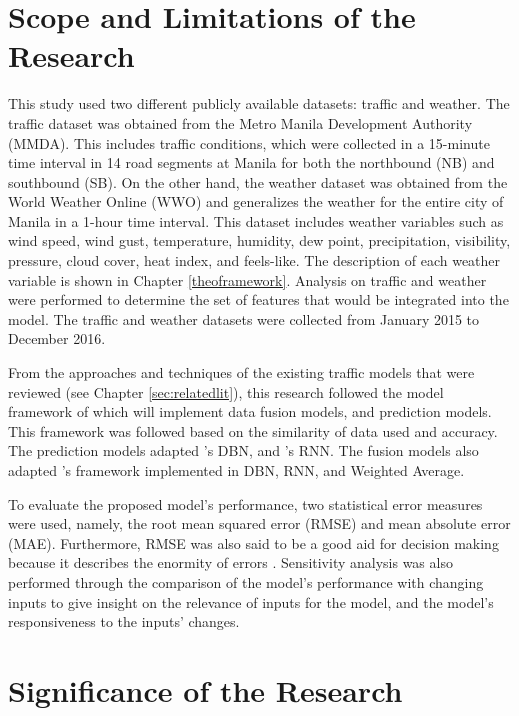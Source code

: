 \section{Scope and Limitations of the Research}
\label{sec:scopelimitations}

This study used two different publicly available datasets: traffic and weather. The traffic dataset was obtained from the Metro Manila Development Authority (MMDA). This includes traffic conditions, which were collected in a 15-minute time interval in 14 road segments at Manila for both the northbound (NB) and southbound (SB). On the other hand, the weather dataset was obtained from the World Weather Online (WWO) and generalizes the weather for the entire city of Manila in a 1-hour time interval. This dataset includes weather variables such as wind speed, wind gust, temperature, humidity, dew point, precipitation, visibility, pressure, cloud cover, heat index, and feels-like. The description of each weather variable is shown in Chapter \ref{theoframework}. Analysis on traffic and weather were performed to determine the set of features that would be integrated into the model. The traffic and weather datasets were collected from January 2015 to December 2016.

From the approaches and techniques of the existing traffic models that were reviewed (see Chapter \ref{sec:relatedlit}), this research followed the model framework of  which will implement data fusion models, and prediction models. This framework was followed based on the similarity of data used and accuracy. The prediction models adapted 's DBN, and 's RNN. The fusion models also adapted 's framework implemented in DBN, RNN, and Weighted Average. 

To evaluate the proposed model’s performance, two statistical error measures were used, namely, the root mean squared error (RMSE) and mean absolute error (MAE). Furthermore, RMSE was also said to be a good aid for decision making because it describes the enormity of errors . Sensitivity analysis was also performed through the comparison of the model’s performance with changing inputs to give insight on the relevance of inputs for the model, and the model’s responsiveness to the inputs’ changes. 





\section{Significance of the Research}
\label{sec:significance}

